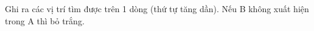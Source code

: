 Ghi ra các vị trí tìm được trên 1 dòng (thứ tự tăng dần). Nếu B không xuất hiện trong A thì bỏ trắng.

\